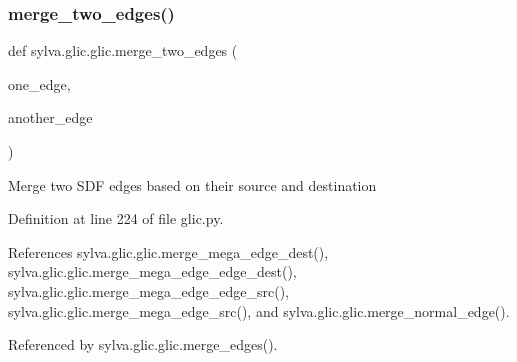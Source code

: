 \subsubsection{\texorpdfstring{merge\+\_\+two\+\_\+edges()}{merge\_two\_edges()}}
{\footnotesize\ttfamily def sylva.\+glic.\+glic.\+merge\+\_\+two\+\_\+edges (\begin{DoxyParamCaption}\item[{}]{one\+\_\+edge,  }\item[{}]{another\+\_\+edge }\end{DoxyParamCaption})}

\begin{DoxyVerb}Merge two SDF edges based on their source and destination \end{DoxyVerb}
 

Definition at line 224 of file glic.\+py.



References sylva.\+glic.\+glic.\+merge\+\_\+mega\+\_\+edge\+\_\+dest(), sylva.\+glic.\+glic.\+merge\+\_\+mega\+\_\+edge\+\_\+edge\+\_\+dest(), sylva.\+glic.\+glic.\+merge\+\_\+mega\+\_\+edge\+\_\+edge\+\_\+src(), sylva.\+glic.\+glic.\+merge\+\_\+mega\+\_\+edge\+\_\+src(), and sylva.\+glic.\+glic.\+merge\+\_\+normal\+\_\+edge().



Referenced by sylva.\+glic.\+glic.\+merge\+\_\+edges().


